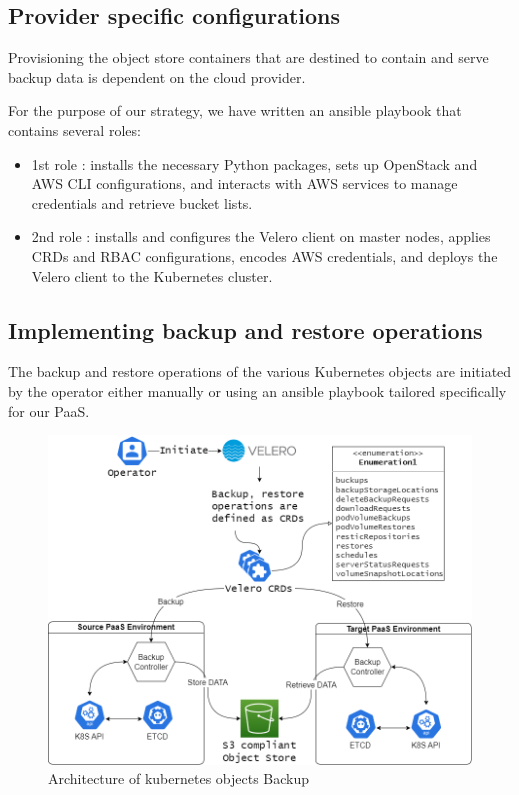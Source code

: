 \subsection{Provider specific configurations }

Provisioning the object store containers that are destined to contain and serve backup data is dependent on the cloud provider.

For the purpose of our strategy, we have written an ansible playbook that contains several roles:
\begin{itemize}[label={--}]
\item 1st role : installs the necessary Python packages, sets up OpenStack and AWS CLI configurations, and interacts with AWS services to manage credentials and retrieve bucket lists.
\item 2nd role : installs and configures the Velero client on master nodes, applies CRDs and RBAC configurations, encodes AWS credentials, and deploys the Velero client to the Kubernetes cluster.
\end{itemize}

\subsection{Implementing backup and restore operations }

The backup and restore operations of the various Kubernetes objects are initiated by the operator either manually or using an ansible playbook tailored specifically for our PaaS. 

 \begin{figure}[H]\centering
\includegraphics[width=1.0\textwidth,angle=00]{assets/f57.png}
\caption{Architecture of kubernetes objects Backup }
\label{fig:f57}
\end{figure}

